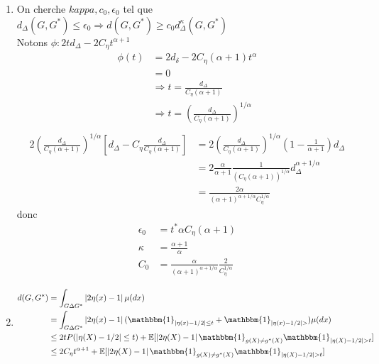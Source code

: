 \documentclass{article}
\theoremstyle{plain}%
\theoremstyle{definition}
\theoremstyle{remark}
\begin{document}
\begin{enumerate}
    \item On cherche $ kappa, c_0, \epsilon _0 $ tel que $ d_\Delta (G, G^*) \leq \epsilon _0 \Rightarrow d(G, G^*) \geq c_0 d_\Delta ^\kappa  (G, G^*) $ \\
    Notons $ \phi : 2t d_\Delta - 2 C_\eta t^{\alpha +1} $ 
    \begin{align*}
        \phi (t) &= 2 d_\delta - 2 C_\eta (\alpha + 1)t^\alpha \\
            &= 0 \\
            &\Rightarrow t = \frac{d_\Delta }{C_\eta (\alpha +1)} \\
            &\Rightarrow t = (\frac{d_\Delta }{C_\eta (\alpha +1)})^{1/\alpha } \\
    \end{align*}
    \begin{align*}
        2 (\frac{d_\Delta }{C_\eta (\alpha +1)})^{1/\alpha } [ d_\Delta - C_\eta \frac{d_\Delta }{C_\eta (\alpha +1)}] &= 2 (\frac{d_\Delta }{C_\eta (\alpha +1)})^{1/\alpha } ( 1 - \frac{1}{\alpha + 1} ) d_\Delta \\
        &= 2 \frac{\alpha }{\alpha + 1 } \frac{1 }{(C_\eta (\alpha  + 1))^{1/\alpha }} d_\Delta ^{\alpha + 1 / \alpha } \\
        &= \frac{2 \alpha }{(\alpha + 1) ^{\alpha + 1 / \alpha } C_\eta ^{ 1 / \alpha }}
    \end{align*}
    donc \begin{align*}
        \epsilon _0 &= t^*\alpha C_\eta (\alpha + 1) \\
        \kappa &= \frac{\alpha + 1 }{\alpha } \\
        C_0 &= \frac{\alpha}{(\alpha +1)^{\alpha +1 / \alpha }} \frac{2}{C_\eta ^{1/\alpha }}
    \end{align*}
    
    \item \begin{align*}
        d(G, G^*) &= \int_{G \Delta G^*}^{}\left| 2 \eta (x) - 1 \right| \mu (dx) \\
            &= \int_{G \Delta G^*}^{} \left| 2 \eta (x) - 1 \right| ( \mathbbm{1}_{\left| \eta (x) - 1/2 \right| \leq t } + \mathbbm{1}_{\left| \eta (x) - 1/2 \right| > }) \mu (dx) \\
            &\leq 2t P(\left| \eta (X) - 1/2 \right| \leq t) + \mathbb{E}[ \left| 2 \eta (X) - 1 \right|  \mathbbm{1}_{g(X) \neq g^*(X)} \mathbbm{1}_{\left| \eta (X) - 1/2 \right| > t}] \\
            &\leq 2 C_\eta t^{\alpha + 1} + \mathbb{E}[ \left| 2 \eta (X) - 1 \right|  \mathbbm{1}_{g(X) \neq g^*(X)} \mathbbm{1}_{\left| \eta (X) - 1/2 \right| > t}]
    \end{align*}
\end{enumerate}
\end{document}
